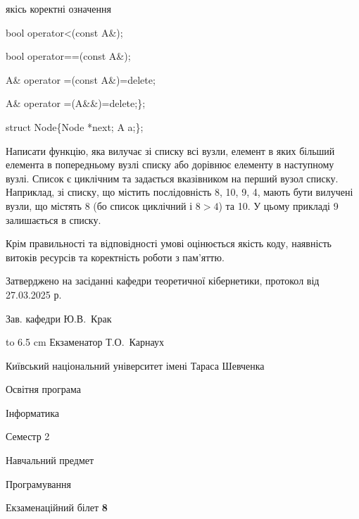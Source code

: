 \documentclass[12pt, ukrainian]{article}
\begin{document}
{\quad  якісь коректні означення 

\quad  bool operator<(const A\&); 

\quad  bool operator==(const A\&); 

\quad A\& operator =(const A\&)=delete; 

\quad  A\& operator =(A\&\&)=delete;\};

struct Node\{Node *next; A a;\};

 Написати функцію, яка вилучає зі списку всі вузли, елемент в яких більший елемента в попередньому вузлі списку або дорівнює елементу в наступному вузлі. Список є циклічним та задається вказівником на перший вузол списку. Наприклад, зі списку, що містить послідовність 8, 10, 9, 4, мають бути вилучені вузли, що містять 8 (бо список циклічний і $8>4$) та 10. У цьому прикладі 9 залишається в списку.

Крім правильності та відповідності умові оцінюється якість коду, наявність витоків ресурсів та коректність роботи з пам'яттю. 

}
{\smallskip\smallskip \begin {scriptsize} Затверджено на засіданні кафедри теоретичної кібернетики, протокол   від   27.03.2025 р.\par\smallskip\smallskip\smallskip\smallskip
{\parbox {6.5 cm} {Зав. кафедри \dotfill Ю.В.~Крак}}\hspace {0.7cm} {\hbox to 6.5 cm { Екзаменатор \dotfill Т.О.~Карнаух}} \end{scriptsize}}
\newpage
{{\begin {scriptsize}\par
{ \center  Київський національний університет імені Тараса Шевченка \par}
{\parbox {5 cm}{Освітня програма \hfill}{\parbox {7 cm}{Інформатика\hfill}}\parbox {6 cm}{\hfill Семестр 2}}\par
{\parbox {5 cm} {Навчальний предмет \hfill}\parbox {7 cm}{Програмування \hfill}\parbox {6cm}{\hfill}\par}\vspace{-15pt} \end{scriptsize}}{\center Екзаменаційний білет \No \textbf { 8 }\par}}
\end{document}
